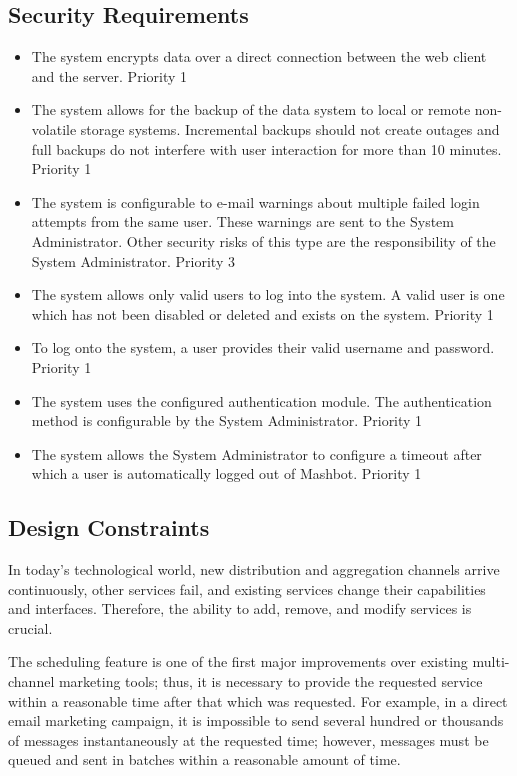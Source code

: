 \documentclass{report}
\begin{document}
	\subsection{Security Requirements} %
        \begin{itemize}
        \item The system encrypts data over a direct connection
          between the web client and the server.  Priority 1
        \item The system allows for the backup of the data system
          to local or remote non-volatile storage systems.
          Incremental backups should not create outages and full
          backups do not interfere with user interaction for more than
          10 minutes. Priority 1
        \item The system is configurable to e-mail warnings about
          multiple failed login attempts from the same user. These
          warnings are sent to the System Administrator. Other
          security risks of this type are the responsibility of the
          System Administrator. Priority 3
        \item The system allows only valid users to log into the
          system. A valid user is one which has not been disabled or
          deleted and exists on the system. Priority 1
        \item To log onto the system, a user provides their valid
          username and password. Priority 1
        \item The system uses the configured authentication
          module. The authentication method is configurable by the
          System Administrator. Priority 1
        \item The system allows the System Administrator to
          configure a timeout after which a user is automatically
          logged out of Mashbot. Priority 1
        \end{itemize}
	\subsection{Design Constraints} %

In today's technological world, new distribution and aggregation channels arrive continuously, other services fail, and existing services change their capabilities and interfaces. Therefore, the ability to add, remove, and modify services is crucial. %

The scheduling feature is one of the first major improvements over existing multi-channel marketing tools; thus, it is necessary to provide the requested service within a reasonable time after that which was requested. For example, in a direct email marketing campaign, it is impossible to send several hundred or thousands of messages instantaneously at the requested time; however, messages must be queued and sent in batches within a reasonable amount of time. %
\end{document}
